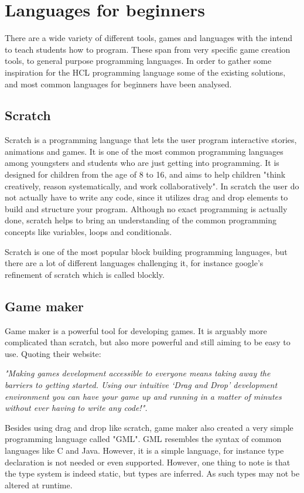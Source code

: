 \section{Languages for beginners}

There are a wide variety of different tools, games and languages with the intend to teach students how to program. 
These span from very specific game creation tools, to general purpose programming languages. 
In order to gather some inspiration for the HCL programming language some of the existing solutions, and most common languages for beginners have been analysed.

\subsection{Scratch}
Scratch is a programming language that lets the user program interactive stories, animations and games. 
It is one of the most common programming languages among youngsters and students who are just getting into programming. 
It is designed for children from the age of 8 to 16, and aims to help children "think creatively, reason systematically, and work collaboratively". 
In scratch the user do not actually have to write any code, since it utilizes drag and drop elements to build and structure your program. Although no exact programming is actually done, scratch helps to bring an understanding of the common programming concepts like variables, loops and conditionals.\cite{ScratchWebsite}

Scratch is one of the most popular block building programming languages, but there are a lot of different languages challenging it, for instance google's refinement of scratch which is called blockly.\cite{Blockly}

\subsection{Game maker}
Game maker is a powerful tool for developing games. It is arguably more complicated than scratch, but also more powerful and still aiming to be easy to use. 
Quoting their website: 

\textit{"Making games development accessible to everyone means taking away the barriers to getting started. Using our intuitive ‘Drag and Drop’ development environment you can have your game up and running in a matter of minutes without ever having to write any code!".}\cite{GameMaker}
 
Besides using drag and drop like scratch, game maker also created a very simple programming language called "GML".
GML resembles the syntax of common languages like C and Java. 
However, it is a simple language, for instance type declaration is not needed or even supported. 
However, one thing to note is that the type system is indeed static, but types are inferred. 
As such types may not be altered at runtime.\cite{GML}

